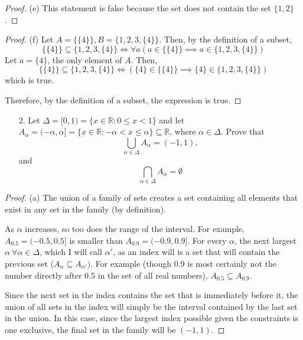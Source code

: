 \documentclass[10pt]{article}
\theoremstyle{definition}
\theoremstyle{plain}
\newcommand{\R}{\mathbb{R}}
\begin{document}
\begin{proof}{(e)}
  This statement is false because the set does not contain the set $\{1,2\}$.
\end{proof}

\begin{proof}{(f)}
  Let $A=\{\{4\}\}, B = \{1,2,3,\{4\}\}$. Then, by the definition of a subset,
  \begin{equation*}
    \{\{4\}\} \subseteq \{1,2,3,\{4\}\} \iff \forall a(a\in \{\{4\}\} \implies a\in \{1,2,3,\{4\}\})
  \end{equation*}
  Let $a=\{4\}$, the only element of $A$. Then,
  \begin{equation*}
      \{\{4\}\} \subseteq \{1,2,3,\{4\}\} \iff (\{4\}\in \{\{4\}\} \implies \{4\}\in \{1,2,3,\{4\}\})
  \end{equation*}
  which is true. \\

  \par Therefore, by the definition of a subset, the expression is true.
\end{proof}



\pagebreak



\begin{enumerate}
  \item[2.] Let $\Delta = [0,1) = \{x \in \R: 0 \leq x < 1\}$ and let $A_\alpha = (-\alpha,\alpha] = \{x \in \R: -\alpha < x \leq \alpha\} \subseteq \R$, where $\alpha \in \Delta$.  Prove that
      $$\bigcup_{\alpha \in \Delta} A_\alpha = (-1,1),$$
   and
      $$\bigcap_{\alpha \in \Delta} A_\alpha = \emptyset$$
\end{enumerate}

\begin{proof}{(a)}
  The union of a family of sets creates a set containing all elements that exist in any set in the family (by definition). \\

  \par As $\alpha$ increases, so too does the range of the interval. For example, $A_{0.5}=(-0.5,0.5]$ is smaller than $A_{0.9}=(-0.9,0.9]$. For every $\alpha$, the next largest $\alpha\ \forall\alpha\in\Delta$, which I will call $\alpha'$, as an index will is a set that will contain the previous set ($A_{\alpha} \subseteq A_{\alpha'})$. For example (though 0.9 is most certainly not the number directly after 0.5 in the set of all real numbers), $A_{0.5} \subseteq A_{0.9}$. \\

  \par Since the next set in the index contains the set that is immediately before it, the union of all sets in the index will simply be the interval contained by the last set in the union. In this case, since the largest index possible given the constraints is one exclusive, the final set in the family will be $(-1,1)$.
\end{proof}
\end{document}
